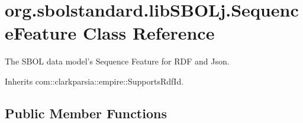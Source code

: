 \hypertarget{classorg_1_1sbolstandard_1_1lib_s_b_o_lj_1_1_sequence_feature}{
\section{org.sbolstandard.libSBOLj.SequenceFeature Class Reference}
\label{classorg_1_1sbolstandard_1_1lib_s_b_o_lj_1_1_sequence_feature}
}


The SBOL data model's Sequence Feature for RDF and Json.  




Inherits com::clarkparsia::empire::SupportsRdfId.

\subsection*{Public Member Functions}
